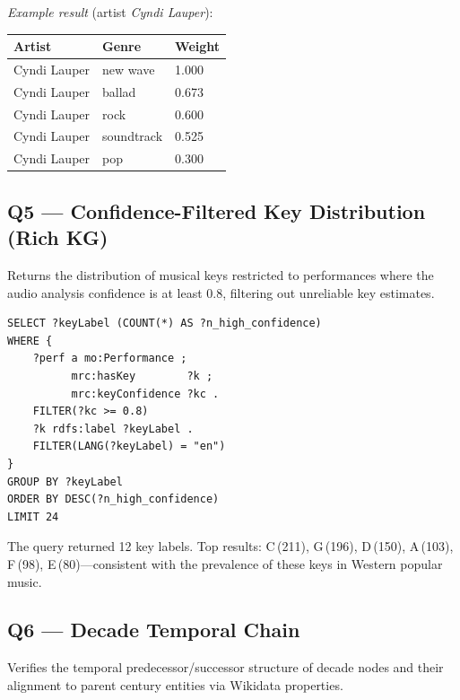 \noindent\textit{Example result} (artist \textit{Cyndi Lauper}):

\begin{table}[H]
\centering\footnotesize
\begin{tabular}{lll}
\toprule
Artist & Genre & Weight \\ \midrule
Cyndi Lauper & new wave   & 1.000 \\
Cyndi Lauper & ballad     & 0.673 \\
Cyndi Lauper & rock       & 0.600 \\
Cyndi Lauper & soundtrack & 0.525 \\
Cyndi Lauper & pop        & 0.300 \\
\bottomrule
\end{tabular}
\end{table}

\subsection*{Q5 — Confidence-Filtered Key Distribution (Rich KG)}

Returns the distribution of musical keys restricted to performances where the audio analysis confidence is at least 0.8, filtering out unreliable key estimates.

\begin{footnotesize}
\begin{verbatim}
SELECT ?keyLabel (COUNT(*) AS ?n_high_confidence)
WHERE {
    ?perf a mo:Performance ;
          mrc:hasKey        ?k ;
          mrc:keyConfidence ?kc .
    FILTER(?kc >= 0.8)
    ?k rdfs:label ?keyLabel .
    FILTER(LANG(?keyLabel) = "en")
}
GROUP BY ?keyLabel
ORDER BY DESC(?n_high_confidence)
LIMIT 24
\end{verbatim}
\end{footnotesize}

\noindent The query returned 12 key labels. Top results: C\,(211), G\,(196), D\,(150), A\,(103), F\,(98), E\,(80)---consistent with the prevalence of these keys in Western popular music.

\subsection*{Q6 — Decade Temporal Chain}

Verifies the temporal predecessor/successor structure of decade nodes and their alignment to parent century entities via Wikidata properties.

